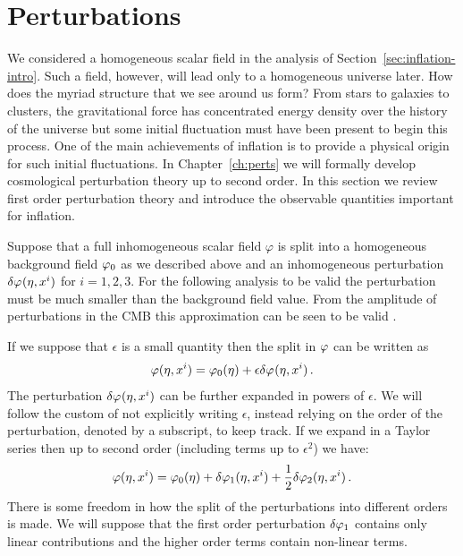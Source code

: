 \section{Perturbations}
\label{sec:perts-intro}

We considered a homogeneous scalar field in the analysis of
Section~\ref{sec:inflation-intro}. Such a field, however, will
lead only to a homogeneous universe later. How does the myriad structure
that we see around us form? From stars to galaxies to clusters, the
gravitational force has concentrated energy density over the history of the
universe but some initial fluctuation must have been present to begin this
process. One of the main achievements of inflation is to provide a physical
origin for
such initial fluctuations. In Chapter~\ref{ch:perts} we will formally develop
cosmological perturbation theory up to second order. In this section we 
review first order perturbation theory and introduce the observable quantities
important for inflation.


Suppose that a full inhomogeneous scalar field
$\varphi$ is split into a homogeneous background field $\varphi_0$ as we described
above and an inhomogeneous perturbation $\delta\varphi_{}(\eta,x^i)$ for $i=1,2,3$. For the
following
analysis to be valid the perturbation must be much smaller than the background
field value. From the amplitude of perturbations in the CMB this approximation
can be seen to be valid \cite{Komatsu:2008hk}. 

If we suppose that $\epsilon$ is a small quantity then the split in $\varphi$
can be written as \cite{Malik:2008im}
% 
\begin{equation}
\label{eq:pertsplit-intro}
\varphi(\eta, x^i) = \varphi_0(\eta) + \epsilon\delta\varphi_{}(\eta, x^i) \,.
\end{equation}
% 
 The perturbation $\delta\varphi_{}(\eta, x^i)$ can be further expanded in
powers of $\epsilon$.  We will follow the
custom of not explicitly writing $\epsilon$, instead relying on the order of
the perturbation, denoted by a subscript, to keep track.
If we expand in a Taylor series then up to second order (\ie including terms
up to $\epsilon^2$) we have:
% 
\begin{equation}
 \varphi(\eta, x^i) = \varphi_0(\eta) + \delta\varphi_{1}(\eta, x^i) + \frac{1}{2}\delta\varphi_{2}(\eta, x^i)
\,.
\end{equation}
% 
There is some freedom in how the split of the perturbations into different
orders is made. We will suppose that the first order perturbation $\delta\varphi_{1}$
contains only linear contributions and the higher order terms contain non-linear
terms. 


